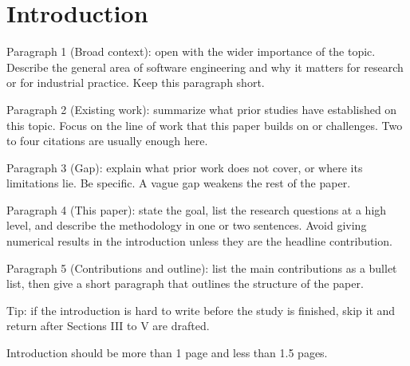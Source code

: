 \section{Introduction}
Paragraph 1 (Broad context): open with the wider importance of the topic.
Describe the general area of software engineering and why it matters for
research or for industrial practice. Keep this paragraph short.

Paragraph 2 (Existing work): summarize what prior studies have established
on this topic. Focus on the line of work that this paper builds on or
challenges. Two to four citations are usually enough here.

Paragraph 3 (Gap): explain what prior work does not cover, or where its
limitations lie. Be specific. A vague gap weakens the rest of the paper.

Paragraph 4 (This paper): state the goal, list the research questions at a
high level, and describe the methodology in one or two sentences. Avoid
giving numerical results in the introduction unless they are the headline
contribution.

Paragraph 5 (Contributions and outline): list the main contributions as a
bullet list, then give a short paragraph that outlines the structure of
the paper.

Tip: if the introduction is hard to write before the study is finished,
skip it and return after Sections III to V are drafted.

Introduction should be more than 1 page and less than 1.5 pages. 
\clearpage